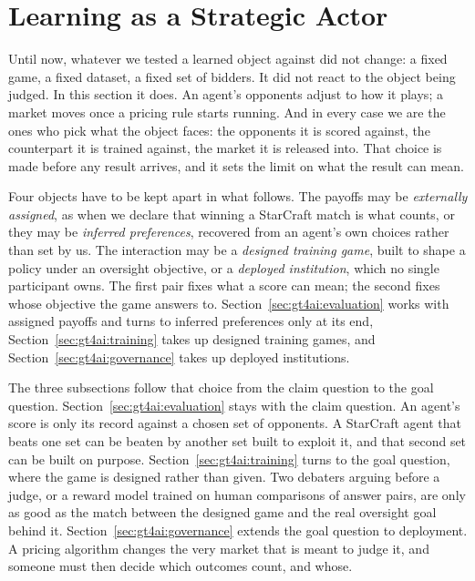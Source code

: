 
\section{Learning as a Strategic Actor}
\label{sec:gt4ai}

Until now, whatever we tested a learned object against did not change: a
fixed game, a fixed dataset, a fixed set of bidders. It did not react to the object
being judged. In this section it does. An agent's opponents adjust to how it plays; a
market moves once a pricing rule starts running. And in every case we are the ones who pick what the object faces: the opponents it is scored
against, the counterpart it is trained against, the market it is released
into. That choice is made before any result arrives, and it sets the limit on what the result can mean.

Four objects have to be kept apart in what follows. The payoffs may be
\emph{externally assigned}, as when we declare that winning a StarCraft match is
what counts, or they may be \emph{inferred preferences}, recovered from an agent's
own choices rather than set by us. The interaction may be a \emph{designed training
game}, built to shape a policy under an oversight objective, or a \emph{deployed
institution}, which no single participant owns. The first pair fixes what a score
can mean; the second fixes whose objective the game answers to.
Section~\ref{sec:gt4ai:evaluation} works with assigned payoffs and turns to
inferred preferences only at its end, Section~\ref{sec:gt4ai:training} takes up
designed training games, and Section~\ref{sec:gt4ai:governance} takes up deployed
institutions.

The three subsections follow that choice from the claim question to the goal question.
Section~\ref{sec:gt4ai:evaluation} stays with the claim question. An agent's score is only its record against a chosen set of opponents. A
StarCraft agent that beats one set can be beaten by another set built to
exploit it, and that second set can be built on purpose. Section~\ref{sec:gt4ai:training} turns to the goal question, where the game is
designed rather than given. Two debaters arguing before a judge, or a reward model
trained on human comparisons of answer pairs, are only as good as the match between
the designed game and the real oversight goal behind it. Section~\ref{sec:gt4ai:governance}
extends the goal question to deployment. A pricing algorithm changes the very market that
is meant to judge it, and someone must then decide which outcomes count, and whose.

